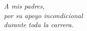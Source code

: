 \begin{flushright}
\itshape
A mis padres,\\
por su apoyo incondicional\\
durante toda la carrera.
\end{flushright}
